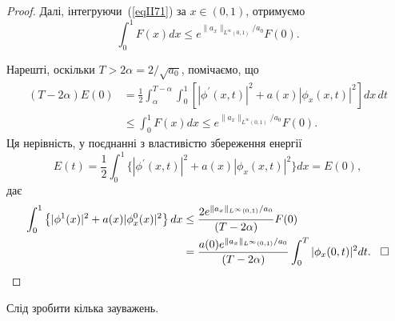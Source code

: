 \begin{proof}
Далі, інтегруючи~(\ref{eqII71}) за $x \in (0,1)$, отримуємо
\begin{equation} \label{eqII72}
    \int_0^1 F(x) dx \leq e^{\|a_x\|_{L^\infty(0,1)}/a_0} F(0).
\end{equation}

Нарешті, оскільки $T> 2\alpha = 2/\sqrt{a_0}$, помічаємо, що
\begin{align*}
 (T - 2\alpha) E(0) &= \frac{1}{2} \int_{\alpha}^{T-\alpha} \int_0^1 \left[|\phi^\prime(x,t)|^2 + a(x)|\phi_x(x,t)|^2\right] dx\, dt
 \\ &\leq \int_0^1 F(x) dx \leq e^{\|a_x\|_{L^\infty(0,1)}/a_0} F(0).
\end{align*}
Ця нерівність, у поєднанні з властивістю збереження енергії
\begin{equation*}
    E(t) = \frac{1}{2} \int_0^1 \{|\phi^\prime(x,t)|^2 + a(x)|\phi_x(x,t)|^2\} dx = E(0),
\end{equation*}
дає
\begin{align} \label{eqII73}
\begin{split}
\int_0^1 \left\{|\phi^1(x)|^2 + a(x)|\phi_x^0(x)|^2\right\} dx &
\leq
\frac{2e^{\|a_x\|_{L^\infty(0,1)}/a_0}} {(T - 2\alpha)}F(0)
\\ &= \frac{a(0)e^{\|a_x\|_{L^\infty(0,1)}/a_0}} {(T - 2\alpha)} \int_0^T |\phi_x(0,t)|^2 dt. \hspace{0.3cm} \hfill \square
\end{split}
\end{align}
\end{proof}
Слід зробити кілька зауважень.

